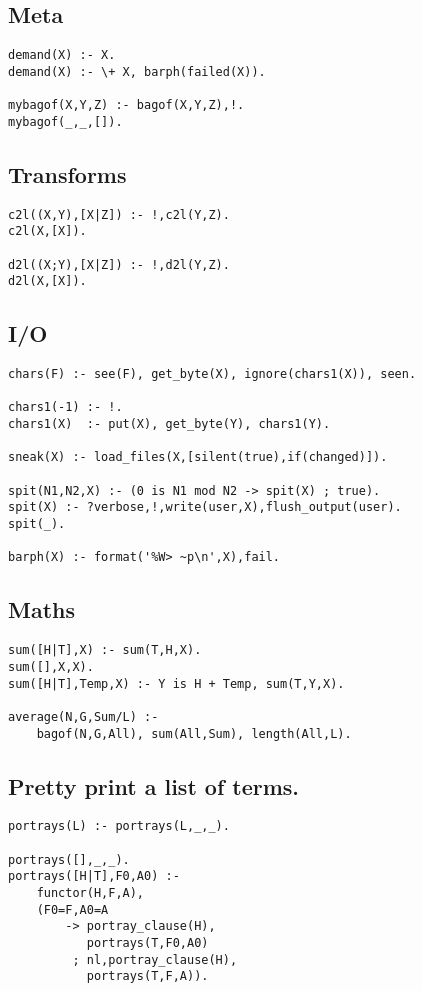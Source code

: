 \subsection{ Meta }\begin{Verbatim}
demand(X) :- X.
demand(X) :- \+ X, barph(failed(X)).

mybagof(X,Y,Z) :- bagof(X,Y,Z),!.
mybagof(_,_,[]).
\end{Verbatim}
\subsection{ Transforms }\begin{Verbatim}
c2l((X,Y),[X|Z]) :- !,c2l(Y,Z).
c2l(X,[X]).

d2l((X;Y),[X|Z]) :- !,d2l(Y,Z).
d2l(X,[X]).
\end{Verbatim}
\subsection{ I/O }\begin{Verbatim}
chars(F) :- see(F), get_byte(X), ignore(chars1(X)), seen.
    
chars1(-1) :- !.
chars1(X)  :- put(X), get_byte(Y), chars1(Y).

sneak(X) :- load_files(X,[silent(true),if(changed)]).

spit(N1,N2,X) :- (0 is N1 mod N2 -> spit(X) ; true).
spit(X) :- ?verbose,!,write(user,X),flush_output(user).
spit(_).

barph(X) :- format('%W> ~p\n',X),fail.
\end{Verbatim}
\subsection{ Maths }\begin{Verbatim}
sum([H|T],X) :- sum(T,H,X).
sum([],X,X).
sum([H|T],Temp,X) :- Y is H + Temp, sum(T,Y,X).

average(N,G,Sum/L) :-
	bagof(N,G,All), sum(All,Sum), length(All,L).
\end{Verbatim}
\subsection{ Pretty print a list of terms.  }\begin{Verbatim}
portrays(L) :- portrays(L,_,_).

portrays([],_,_).
portrays([H|T],F0,A0) :-
	functor(H,F,A),
	(F0=F,A0=A
        -> portray_clause(H),
           portrays(T,F0,A0)
         ; nl,portray_clause(H),
           portrays(T,F,A)).
\end{Verbatim}
